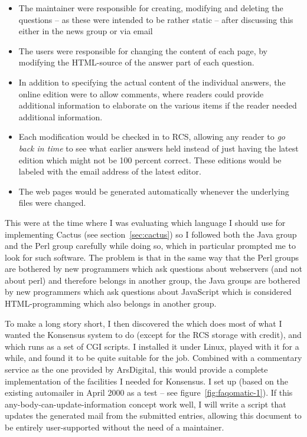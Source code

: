\begin{itemize}
\item The maintainer were responsible for creating, modifying and
  deleting the questions -- as these were intended to be rather static
  -- after discussing this either in the news group or via email
\item The users were responsible for changing the content of each
  page, by modifying the HTML-source of the answer part of each
  question.

\item In addition to specifying the actual content of the individual
  answers, the online edition were to allow comments, where readers
  could provide additional information to elaborate on the various
  items if the reader needed additional information.
  
\item Each modification would be checked in to RCS, allowing any
  reader to \textit{go back in time} to see what earlier answers held
  instead of just having the latest edition which might not be 100
  percent correct.  These editions would be labeled with the email
  address of the latest editor.
  
\item The web pages would be generated automatically whenever the
  underlying files were changed.
  
\end{itemize}

This were at the time where I was evaluating which language I should
use for implementing Cactus (see section~\vref{sec:cactus}) so I
followed both the Java group and the Perl group carefully while doing
so, which in particular prompted me to look for such software.  The
problem is that in the same way that the Perl groups are bothered by
new programmers which ask questions about webservers (and not about
perl) and therefore belongs in another group, the Java groups are
bothered by new programmers which ask questions about JavaScript which
is considered HTML-programming which also belongs in another group.


To make a long story short, I then discovered the
which does most of what I wanted the Konsensus system to do (except
for the RCS storage with credit), and which runs as a set of CGI
scripts.  I installed it under Linux, played with it for a while, and
found it to be quite suitable for the job.  Combined with a commentary
service as the one provided by ArsDigital, this would provide a
complete implementation of the facilities I needed for Konsensus.  I
set up  (based on the existing
automailer in April 2000 as a test -- see
figure~\vref{fig:faqomatic-1}).  If this
any-body-can-update-information concept work well, I will write a
script that updates the generated mail from the submitted entries,
allowing this document to be entirely user-supported without the need
of a maintainer.

  
